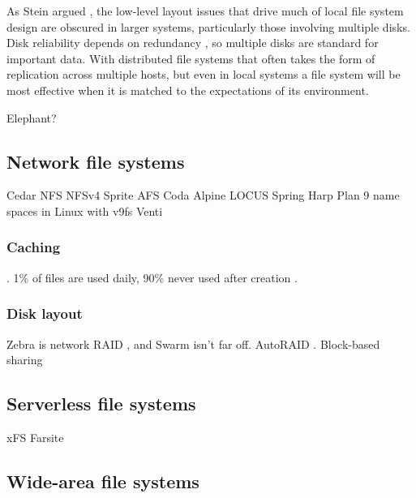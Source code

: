 As Stein argued \cite{stein05}, the low-level layout issues that drive much of local file system design are obscured in larger systems, particularly those involving multiple disks. Disk reliability depends on redundancy \cite{patterson}, so multiple disks are standard for important data. With distributed file systems that often takes the form of replication across multiple hosts, but even in local systems a file system will be most effective when it is matched to the expectations of its environment.


Elephant? \cite{santry}

\subsection{Network file systems}




Cedar \cite{gifford,hagmann}
NFS \cite{sandberg,pawlowski,callaghan}
NFSv4
Sprite \cite{baker91,nelson,welch}
AFS \cite{howard}
Coda \cite{kistler,satyanarayanan}
Alpine \cite{brown}
LOCUS \cite{walker}
Spring \cite{khalidi}
Harp \cite{liskov}
Plan 9 \cite{pike90} name spaces \cite{pike92} in Linux with v9fs \cite{hensbergen}
Venti \cite{quinlan}

\subsubsection{Caching}
\cite{dahlin94a}\cite{chaiken}\cite{blaze}\cite{dahlin94b}\cite{keleher}\cite{muthitacharoen}. 1\% of files are used daily, 90\% never used after creation \cite{gibson98b}.

\subsubsection{Disk layout}
Zebra \cite{hartman93} is network RAID \cite{patterson}, and Swarm \cite{hartman99} isn't far off. AutoRAID \cite{wilkes95}. Block-based sharing \cite{mcgregor}

\subsection{Serverless file systems}

xFS \cite{wang93,anderson95b,wang98}
Farsite \cite{bolosky,adya}\cite{douceur01}\cite{douceur02}

\subsection{Wide-area file systems}

